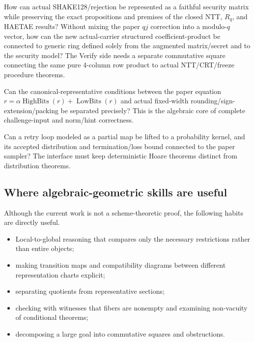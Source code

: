 \begin{question}
How can actual SHAKE128/rejection  be represented as a faithful
security matrix while preserving the exact propositions and premises of the
closed NTT, \(R_q\), and HAETAE results? Without mixing the paper \(qj\)
correction into a modulo-\(q\) vector, how can the new actual-carrier structured
coefficient-product be connected to generic ring 
defined solely from the augmented matrix/secret and to the security model?
The Verify side needs a separate commutative square connecting the same pure
4-column row product to actual NTT/CRT/freeze procedure theorems.
\end{question}

\begin{question}
Can the canonical-representative conditions between the paper equation
\(r=\alpha\operatorname{HighBits}(r)+\operatorname{LowBits}(r)\) and actual
fixed-width rounding/sign-extension/packing be separated precisely?
This is the algebraic core of complete challenge-input and norm/hint correctness.
\end{question}

\begin{question}
Can a retry loop modeled as a partial map be lifted to a probability kernel,
and its accepted distribution and termination/loss bound connected to the paper
sampler? The interface must keep deterministic Hoare theorems distinct from
distribution theorems.
\end{question}

\subsection{Where algebraic-geometric skills are useful}

Although the current work is not a scheme-theoretic proof, the following habits
are directly useful.

\begin{itemize}
  \item Local-to-global reasoning that compares only the necessary restrictions
        rather than entire objects;
  \item making transition maps and compatibility diagrams between different
        representation charts explicit;
  \item separating quotients from representative sections;
  \item checking with witnesses that fibers are nonempty and examining
        non-vacuity of conditional theorems;
  \item decomposing a large goal into commutative squares and obstructions.
\end{itemize}

